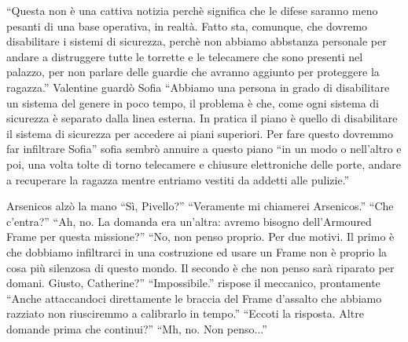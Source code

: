     ``Questa non è una cattiva notizia perchè significa che le difese saranno meno pesanti di una base operativa, in
    realtà. Fatto sta, comunque, che dovremo disabilitare i sistemi di sicurezza, perchè non abbiamo abbstanza personale
    per andare a distruggere tutte le torrette e le telecamere che sono presenti nel palazzo, per non parlare delle
    guardie che avranno aggiunto per proteggere la ragazza.'' Valentine guardò Sofia ``Abbiamo una persona in grado di
    disabilitare un sistema del genere in poco tempo, il problema è che, come ogni sistema di sicurezza è separato dalla
    linea esterna. In pratica il piano è quello di disabilitare il sistema di sicurezza per accedere ai piani superiori.
    Per fare questo dovremmo far infiltrare Sofia'' sofia sembrò annuire a questo piano ``in un modo o nell'altro e poi,
    una volta tolte di torno telecamere e chiusure elettroniche delle porte, andare a recuperare la ragazza mentre
    entriamo vestiti da addetti alle pulizie.''

    Arsenicos alzò la mano ``Sì, Pivello?'' ``Veramente mi chiamerei Arsenicos.'' ``Che c'entra?'' ``Ah, no. La domanda
    era un'altra: avremo bisogno dell'Armoured Frame per questa missione?'' ``No, non penso proprio. Per due motivi. Il
    primo è che dobbiamo infiltrarci in una costruzione ed usare un Frame non è proprio la cosa più silenzosa di questo
    mondo. Il secondo è che non penso sarà riparato per domani. Giusto, Catherine?'' ``Impossibile.'' rispose il
    meccanico, prontamente ``Anche attaccandoci direttamente le braccia del Frame d'assalto che abbiamo razziato non
    riusciremmo a calibrarlo in tempo.'' ``Eccoti la risposta. Altre domande prima che continui?'' ``Mh, no. Non
    penso...''

